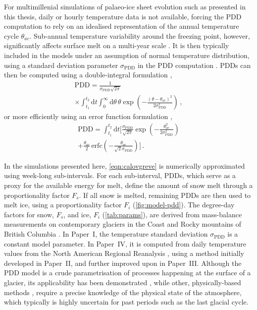 \documentclass[a4paper]{kappa}
\newcommand{\PDD}[0]{\mathrm{PDD}}
\newcommand{\sPDD}[0]{\sigma_{\mathrm{PDD}}}
\newcommand{\CCLI}[0]{Paper~I}      %
\newcommand{\PSDV}[0]{Paper~II}     %
\newcommand{\PSDP}[0]{Paper~III}    %
\newcommand{\CCYC}[0]{Paper~IV}     %
\begin{document}
For multimillenial simulations of palaeo-ice sheet evolution such as
presented in this thesis, daily or hourly temperature data is not available,
forcing the PDD computation to rely on an idealised representation of the
annual temperature cycle $\theta_{ac}$. Sub-annual temperature variability around
the freezing point, however, significantly affects surface melt on a multi-year
scale \citep{Arnold.Mackay.1964}. It is then typically included in the models
under an assumption of normal temperature distribution, using a standard
deviation parameter $\sPDD$ in the PDD computation \citep{Braithwaite.1984}.
PDDs can then be computed using a double-integral formulation
\citep{Reeh.1991},
\begin{multline}
    \PDD = \frac{1}{\sPDD\sqrt{2\pi}} \\
        \times
        \int_{t_1}^{t_2} \mathrm{d}t
        \int_{0}^{\infty} \mathrm{d}\theta \,
        \theta \exp\left({-\frac{(\theta-\theta_{ac})^2}{2\sPDD^2}}\right) \,,
\end{multline}
or more efficiently using an error function formulation
\citep{Calov.Greve.2005},
\begin{multline}
    \label{eqn:calovgreve}
    \PDD = \int_{t_1}^{t_2} \mathrm{d}t
        \bigg[\frac{\sPDD}{\sqrt{2\pi}}
                \exp\left({-\frac{\theta_{ac}^2}{2\sPDD^2}}\right) \\
              + \frac{\theta_{ac}}{2} \, \mathrm{erfc}
                \left(-\frac{\theta_{ac}}{\sqrt{2}\sPDD}\right)\bigg] \,.
\end{multline}

In the simulations presented here, \cref{eqn:calovgreve} is numerically
approximated using week-long sub-intervals. For each sub-interval, PDDs, which
serve as a proxy for the available energy for melt, define the amount of snow
melt through a proportionality factor $F_s$. If all snow is melted, remaining
PDDs are then used to melt ice, using a proportionality factor $F_i$
(\cref{fig:model-pdd}). The degree-day factors for snow, $F_s$, and ice, $F_i$
(\cref{tab:params}),
are derived from mass-balance measurements on contemporary glaciers in the
Coast and Rocky mountains of British Columbia \citep{Shea.etal.2009}. In
{\CCLI}, the temperature standard deviation $\sPDD$ is a constant model
parameter. In {\CCYC}, it is computed from daily temperature values from the
North American Regional Reanalysis \citep[NARR,][]{Mesinger.etal.2006}, using
a method initially developed in {\PSDV}, and further improved upon in {\PSDP}.
Although the PDD model is a crude parametrisation of processes happening at the
surface of a glacier, its applicability has been demonstrated
\citep[e.g.][]{Hock.2003},
while other, physically-based methods \citep[e.g.][]{Hock.2005}, require a
precise knowledge of the physical state of the atmosphere, which typically is highly
uncertain for past periods such as the last glacial cycle.
\end{document}
